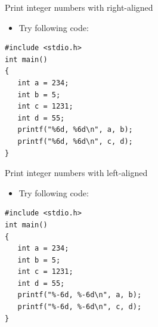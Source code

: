 \begin{frame}[fragile]{Print integer numbers with right-aligned}
\begin{itemize}
	\item {Try following code:}
\end{itemize}

\begin{lstlisting}
#include <stdio.h>
int main()
{
   int a = 234;
   int b = 5;
   int c = 1231;
   int d = 55;
   printf("%6d, %6d\n", a, b);
   printf("%6d, %6d\n", c, d);
}
\end{lstlisting}
\end{frame}

\begin{frame}[fragile]{Print integer numbers with left-aligned}
\begin{itemize}
	\item {Try following code:}
\end{itemize}

\begin{lstlisting}
#include <stdio.h>
int main()
{
   int a = 234;
   int b = 5;
   int c = 1231;
   int d = 55;
   printf("%-6d, %-6d\n", a, b);
   printf("%-6d, %-6d\n", c, d);
}
\end{lstlisting}
\end{frame}